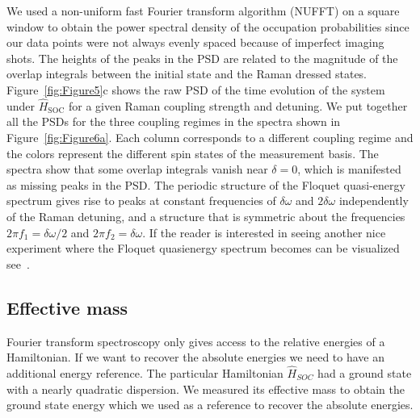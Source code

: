 We used a non-uniform fast Fourier transform algorithm (NUFFT) on a square window to obtain the power spectral density of the occupation probabilities since our data points were not always evenly spaced because of imperfect imaging shots. The heights of the peaks in the PSD are related to the magnitude of the overlap integrals between the initial state and the Raman dressed states. Figure~\ref{fig:Figure5}c shows the raw PSD of the time evolution of the system under $\hat{H}_{\mathrm{SOC}}$ for a given Raman coupling strength and detuning. We put together all the PSDs for the three coupling regimes in the spectra shown in Figure~\ref{fig:Figure6a}. Each column corresponds to a different coupling regime and the colors represent the different spin states of the measurement basis. The spectra show that some overlap integrals vanish near $\delta=0$, which is manifested as missing peaks in the PSD. The periodic structure of the Floquet quasi-energy spectrum gives rise to peaks at constant frequencies of $\delta\omega$ and $2\delta\omega$ independently of the Raman detuning, and a structure that is symmetric about the frequencies $2\pi f_1=\delta\omega/2$ and $2\pi f_2=\delta\omega$. If the reader is interested in seeing another nice experiment where the Floquet quasienergy spectrum becomes can be visualized see~\cite{deng_observation_2015}.


\subsection{Effective mass}
\label{sec:effective_mass}

Fourier transform spectroscopy only gives access to the relative energies of a Hamiltonian. If we want to recover the absolute energies we need to have an additional energy reference. The particular Hamiltonian $\hat{H}_{SOC}$ had a ground state with a nearly quadratic dispersion. We measured its effective mass to obtain the ground state energy which we used as a reference to recover the absolute energies. 

